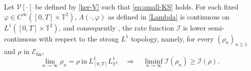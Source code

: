 \begin{lem}\label{Iup L-S-C}
Let $\mathcal{V}[\cdot]$ be defined by \eqref{ker-V} such that \eqref{eq:small-KS} holds. For each fixed $\varphi \in C^{\infty}([0,T]\times\mathbb{T}^2)$, $\Lambda(\cdot,\varphi)$ as defined in \eqref{Lambda} is continuous on $L^1([0,T] \times \mathbb{T}^2)$, and consequently , the rate function $\mathcal{I}$ is lower semi-continuous  with respect to the strong $L^1$ topology, namely, for every $(\rho_n)_{n\geq1}$ and $\rho$ in $\mathcal{E}_{\mathrm{fin}}$, 
  \begin{equation}\label{IUP LSC}
\lim_{n \to \infty}\rho_n = \rho \ \text{in} \ L^1_{[0,T]}L^1_{\mathbb{T}^2} \quad \Rightarrow \quad \liminf_{n \to \infty}\mathcal{I}(\rho_n)\geq \mathcal{I}(\rho).
  \end{equation}
\end{lem}
